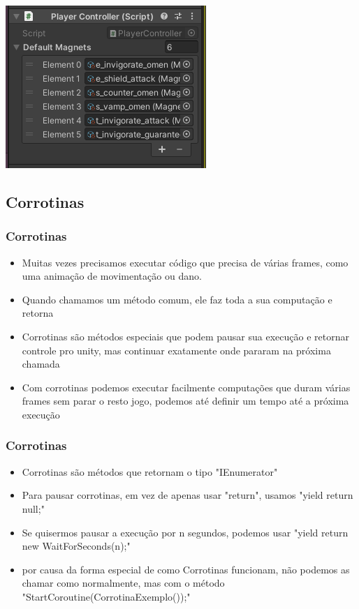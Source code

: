 \documentclass{beamer}
\begin{document}
	\begin{frame}
		\begin{center}
			\includegraphics{so-monobehaviour}
		\end{center}
	\end{frame}

	\subsection{Corrotinas}
	\begin{frame}
		\frametitle{Corrotinas}
		\begin{itemize}
			\item Muitas vezes precisamos executar código que precisa de várias
				frames, como uma animação de movimentação ou dano.

			\item Quando chamamos um método comum, ele faz toda a sua
				computação e retorna

			\item Corrotinas são métodos especiais que podem pausar sua
				execução e retornar controle pro unity, mas continuar
				exatamente onde pararam na próxima chamada

			\item Com corrotinas podemos executar facilmente computações que
				duram várias frames sem parar o resto jogo, podemos até definir
				um tempo até a próxima execução

		\end{itemize}
	\end{frame}

	\begin{frame}
		\frametitle{Corrotinas}
		\begin{itemize}
			\item Corrotinas são métodos que retornam o tipo "IEnumerator"

			\item Para pausar corrotinas, em vez de apenas usar "return",
				usamos "yield return null;"

			\item Se quisermos pausar a execução por n segundos, podemos usar
				"yield return new WaitForSeconds(n);"

			\item por causa da forma especial de como Corrotinas funcionam, não
				podemos as chamar como normalmente, mas com o método
				"StartCoroutine(CorrotinaExemplo());"

		\end{itemize}
	\end{frame}
\end{document}
